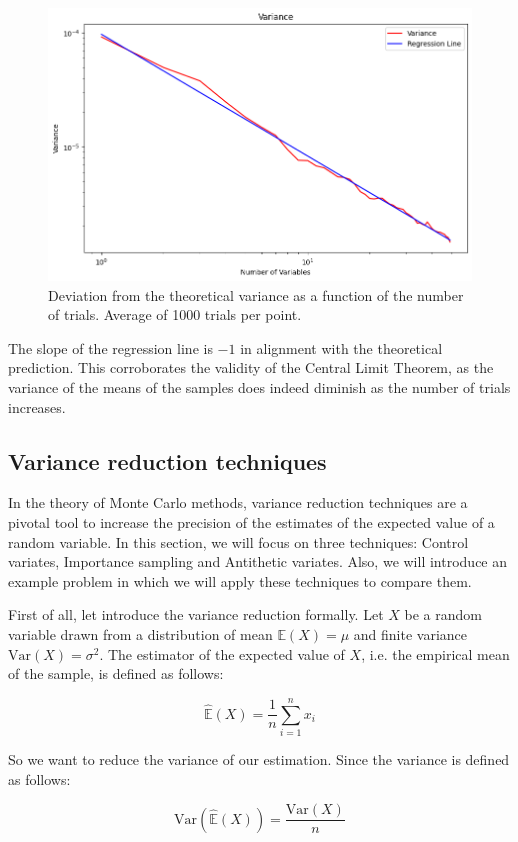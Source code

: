 \documentclass{article}
\begin{document}
\begin{figure}[H]
	\centering
	\includegraphics[width=0.5\linewidth]{./Figures/CLT/varianceslope.png}
	\caption{Deviation from the theoretical variance as a function of the number of trials. Average of 1000 trials per point.}
	\label{fig:variancereg}
\end{figure}

The slope of the regression line is \(-1\) in alignment with the theoretical prediction. This corroborates the validity of the Central Limit Theorem, as the variance of the means of the samples does indeed diminish as the number of trials increases.

\subsection{Variance reduction techniques}
\label{sec:variance_reduction}

In the theory of Monte Carlo methods, variance reduction techniques are a pivotal tool to increase the precision of the estimates of the expected value of a random variable. In this section, we will focus on three techniques: Control variates, Importance sampling and Antithetic variates. Also, we will introduce an example problem in which we will apply these techniques to compare them.

First of all, let introduce the variance reduction formally. Let $X$ be a random variable drawn from a distribution of mean \(\mathbb{E}(X) = \mu\) and finite variance \(\mathrm{Var}(X) = \sigma^2\). The estimator of the expected value of \(X\), i.e. the empirical mean of the sample, is defined as follows:

\begin{equation} 
	\label{eq:expectedvalueestimate} 
	\hat{\mathbb{E}}(X) = \frac{1}{n} \sum_{i=1}^{n} x_i
\end{equation}

So we want to reduce the variance of our estimation. Since the variance is defined as follows:

\begin{equation} 
	\label{eq:variance} 
	\mathrm{Var}(\hat{\mathbb{E}}(X)) = \frac{\mathrm{Var}(X)}{n}
\end{equation}
\end{document}
